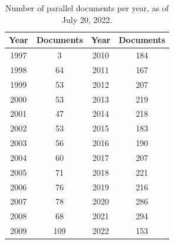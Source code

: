 \begin{table}
\centering
\begin{tabular}{cc|cc}
\toprule
Year & Documents & Year & Documents\\
\midrule
1997 &	3 & 2010	&184\\
1998 & 64 & 2011	&167\\
1999 & 53 & 2012&	207 \\
2000 & 53 & 2013 &	219 \\
2001 &	47 &2014	&218\\
2002 & 53 &2015	&183 \\
2003 &	56 & 2016	&190\\
2004&	60 & 2017	&207\\
2005	&71 & 2018	&221 \\
2006	&76 & 2019	&216 \\
2007	&78 & 2020	&286 \\
2008	&68 & 2021	&294 \\
2009	&109&2022	&153\\
\bottomrule
\end{tabular}
\caption{Number of parallel documents per year, as of July 20, 2022.}
\label{tab:docs-per-year}
\end{table}


